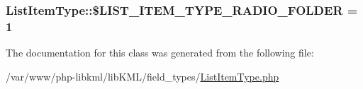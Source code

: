 \label{d7/d1b/classListItemType_ae84a78642e9a6f748cd8026406295eb1}
\hypertarget{classListItemType_af5645a2a86016dfb081ac1e1f1a2e95f}{
\subsubsection[{\$LIST\_\-ITEM\_\-TYPE\_\-RADIO\_\-FOLDER}]{\setlength{\rightskip}{0pt plus 5cm}ListItemType::\$LIST\_\-ITEM\_\-TYPE\_\-RADIO\_\-FOLDER = 1}}
\label{d7/d1b/classListItemType_af5645a2a86016dfb081ac1e1f1a2e95f}


The documentation for this class was generated from the following file:\begin{DoxyCompactItemize}
\item 
/var/www/php-\/libkml/libKML/field\_\-types/\hyperlink{ListItemType_8php}{ListItemType.php}\end{DoxyCompactItemize}
